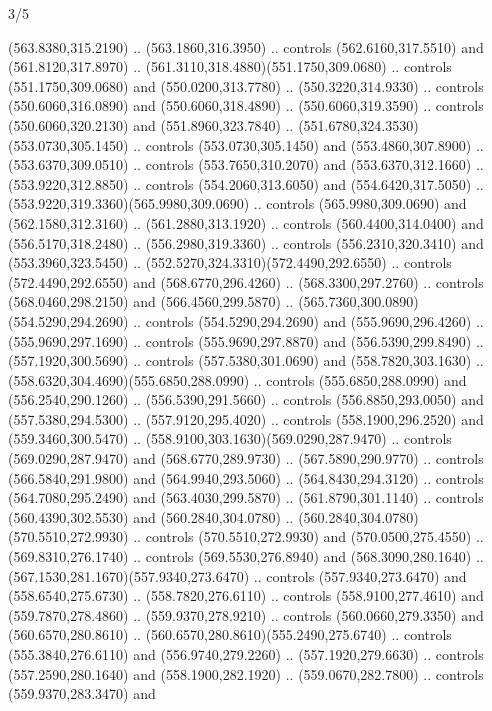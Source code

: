 \begin{flagdescription}{3/5}
\begin{scope}[shift={(0.5\flaglength,0.5\flagwidth)},scale=\flagwidth/1075]
\begin{scope}[y=0.80pt, x=0.80pt, yscale=-2.37, xscale=2.37,xshift=-402,yshift=-230.4]
  (563.8380,315.2190) .. (563.1860,316.3950) .. controls (562.6160,317.5510) and
  (561.8120,317.8970) .. (561.3110,318.4880)(551.1750,309.0680) .. controls
  (551.1750,309.0680) and (550.0200,313.7780) .. (550.3220,314.9330) .. controls
  (550.6060,316.0890) and (550.6060,318.4890) .. (550.6060,319.3590) .. controls
  (550.6060,320.2130) and (551.8960,323.7840) ..
  (551.6780,324.3530)(553.0730,305.1450) .. controls (553.0730,305.1450) and
  (553.4860,307.8900) .. (553.6370,309.0510) .. controls (553.7650,310.2070) and
  (553.6370,312.1660) .. (553.9220,312.8850) .. controls (554.2060,313.6050) and
  (554.6420,317.5050) .. (553.9220,319.3360)(565.9980,309.0690) .. controls
  (565.9980,309.0690) and (562.1580,312.3160) .. (561.2880,313.1920) .. controls
  (560.4400,314.0400) and (556.5170,318.2480) .. (556.2980,319.3360) .. controls
  (556.2310,320.3410) and (553.3960,323.5450) ..
  (552.5270,324.3310)(572.4490,292.6550) .. controls (572.4490,292.6550) and
  (568.6770,296.4260) .. (568.3300,297.2760) .. controls (568.0460,298.2150) and
  (566.4560,299.5870) .. (565.7360,300.0890)(554.5290,294.2690) .. controls
  (554.5290,294.2690) and (555.9690,296.4260) .. (555.9690,297.1690) .. controls
  (555.9690,297.8870) and (556.5390,299.8490) .. (557.1920,300.5690) .. controls
  (557.5380,301.0690) and (558.7820,303.1630) ..
  (558.6320,304.4690)(555.6850,288.0990) .. controls (555.6850,288.0990) and
  (556.2540,290.1260) .. (556.5390,291.5660) .. controls (556.8850,293.0050) and
  (557.5380,294.5300) .. (557.9120,295.4020) .. controls (558.1900,296.2520) and
  (559.3460,300.5470) .. (558.9100,303.1630)(569.0290,287.9470) .. controls
  (569.0290,287.9470) and (568.6770,289.9730) .. (567.5890,290.9770) .. controls
  (566.5840,291.9800) and (564.9940,293.5060) .. (564.8430,294.3120) .. controls
  (564.7080,295.2490) and (563.4030,299.5870) .. (561.8790,301.1140) .. controls
  (560.4390,302.5530) and (560.2840,304.0780) ..
  (560.2840,304.0780)(570.5510,272.9930) .. controls (570.5510,272.9930) and
  (570.0500,275.4550) .. (569.8310,276.1740) .. controls (569.5530,276.8940) and
  (568.3090,280.1640) .. (567.1530,281.1670)(557.9340,273.6470) .. controls
  (557.9340,273.6470) and (558.6540,275.6730) .. (558.7820,276.6110) .. controls
  (558.9100,277.4610) and (559.7870,278.4860) .. (559.9370,278.9210) .. controls
  (560.0660,279.3350) and (560.6570,280.8610) ..
  (560.6570,280.8610)(555.2490,275.6740) .. controls (555.3840,276.6110) and
  (556.9740,279.2260) .. (557.1920,279.6630) .. controls (557.2590,280.1640) and
  (558.1900,282.1920) .. (559.0670,282.7800) .. controls (559.9370,283.3470) and

\end{scope}
\end{scope}
\end{flagdescription}
